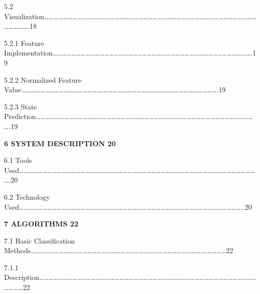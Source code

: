 \documentclass[a4paper,12pt]{article}
\begin{document}
5.2
Visualization\ldots\ldots\ldots\ldots\ldots\ldots\ldots\ldots\ldots\ldots\ldots\ldots\ldots\ldots\ldots\ldots\ldots\ldots\ldots\ldots\ldots\ldots\ldots\ldots\ldots\ldots\ldots\ldots\ldots\ldots\ldots\ldots\ldots\ldots\ldots\ldots\ldots\ldots\ldots\ldots\ldots\ldots\ldots\ldots\ldots\ldots\ldots\ldots\ldots\ldots.18

5.2.1 Feature
Implementation\ldots\ldots\ldots\ldots\ldots\ldots\ldots\ldots\ldots\ldots\ldots\ldots\ldots\ldots\ldots\ldots\ldots\ldots\ldots\ldots\ldots\ldots\ldots\ldots\ldots\ldots\ldots\ldots\ldots\ldots\ldots\ldots\ldots\ldots\ldots\ldots\ldots\ldots\ldots\ldots\ldots\ldots.19

5.2.2 Normalized Feature
Value\ldots\ldots\ldots\ldots\ldots\ldots\ldots\ldots\ldots\ldots\ldots\ldots\ldots\ldots\ldots\ldots.\ldots\ldots\ldots\ldots\ldots\ldots\ldots\ldots\ldots\ldots\ldots\ldots\ldots\ldots\ldots\ldots\ldots\ldots\ldots\ldots\ldots\ldots\ldots\ldots\ldots.19

5.2.3 State
Prediction\ldots\ldots\ldots\ldots\ldots\ldots\ldots\ldots\ldots\ldots\ldots\ldots\ldots\ldots\ldots\ldots\ldots\ldots\ldots\ldots\ldots\ldots\ldots\ldots\ldots\ldots\ldots\ldots\ldots\ldots\ldots\ldots\ldots\ldots\ldots\ldots\ldots\ldots\ldots\ldots\ldots\ldots\ldots\ldots\ldots\ldots\ldots.19

\textbf{6 SYSTEM DESCRIPTION 20}

6.1 Tools
Used\ldots\ldots\ldots\ldots\ldots\ldots\ldots\ldots\ldots\ldots\ldots\ldots\ldots\ldots\ldots\ldots\ldots\ldots\ldots\ldots\ldots\ldots\ldots\ldots\ldots\ldots\ldots\ldots\ldots\ldots\ldots\ldots\ldots\ldots\ldots\ldots\ldots\ldots\ldots\ldots\ldots\ldots\ldots\ldots\ldots\ldots\ldots\ldots\ldots\ldots\ldots.20

6.2 Technology
Used\ldots\ldots\ldots\ldots\ldots\ldots\ldots\ldots\ldots\ldots\ldots\ldots\ldots\ldots\ldots\ldots\ldots\ldots\ldots\ldots\ldots\ldots\ldots\ldots\ldots\ldots\ldots\ldots\ldots\ldots\ldots\ldots\ldots\ldots\ldots\ldots\ldots\ldots\ldots\ldots\ldots\ldots\ldots\ldots\ldots\ldots\ldots..20

\textbf{7 ALGORITHMS 22}

7.1 Basic Classification
Methods\ldots\ldots\ldots\ldots\ldots\ldots\ldots\ldots\ldots\ldots\ldots\ldots\ldots\ldots\ldots\ldots\ldots\ldots\ldots\ldots\ldots\ldots\ldots\ldots\ldots\ldots\ldots\ldots\ldots\ldots\ldots\ldots\ldots\ldots\ldots\ldots.\ldots\ldots\ldots\ldots\ldots22

7.1.1
Description\ldots\ldots\ldots\ldots\ldots\ldots\ldots\ldots\ldots\ldots\ldots\ldots\ldots\ldots\ldots\ldots\ldots\ldots\ldots\ldots\ldots\ldots\ldots\ldots\ldots\ldots\ldots\ldots\ldots\ldots\ldots\ldots\ldots\ldots\ldots\ldots\ldots\ldots\ldots\ldots\ldots\ldots\ldots\ldots\ldots\ldots\ldots\ldots\ldots\ldots22
\end{document}
